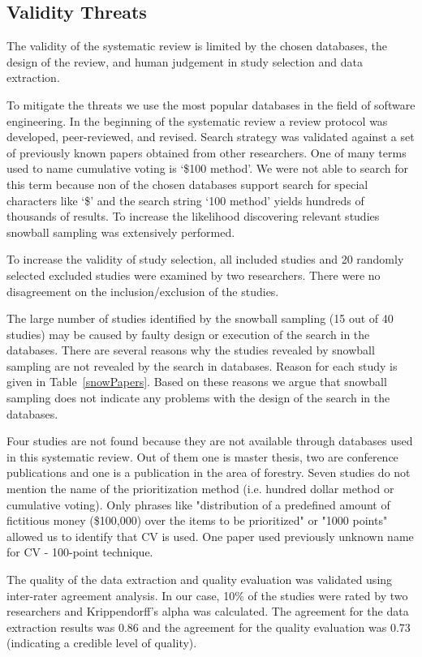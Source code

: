 \subsection{Validity Threats}
The validity of the systematic review is limited by the chosen databases, the design of the review, and human judgement in study selection and data extraction.

To mitigate the threats we use the most popular databases in the field of software engineering.
In the beginning of the systematic review a review protocol was developed, peer-reviewed, and revised.
Search strategy was validated against a set of previously known papers obtained from other researchers.
One of many terms used to name cumulative voting is `\$100 method'.
We were not able to search for this term because non of the chosen databases support search for special characters like `\$' and the search string `100 method' yields hundreds of thousands of results.
To increase the likelihood discovering relevant studies snowball sampling was extensively performed.

To increase the validity of study selection, all included studies and 20 randomly selected excluded studies were examined by two researchers.
There were no disagreement on the inclusion/exclusion of the studies.

The large number of studies identified by the snowball sampling (15 out of 40 studies) may be caused by faulty design or execution of the search in the databases.
There are several reasons why the studies revealed by snowball sampling are not revealed by the search in databases. Reason for each study is given in Table~\ref{snowPapers}.
Based on these reasons we argue that snowball sampling does not indicate any problems with the design of the search in the databases.

Four studies are not found because they are not available through databases used in this systematic review. Out of them one is master thesis, two are conference publications and one is a publication in the area of forestry.
Seven studies do not mention the name of the prioritization method (i.e. hundred dollar method or cumulative voting).
Only phrases like "distribution of a predefined amount of fictitious money (\$100,000) over the items to be prioritized" or "1000 points" allowed us to identify that CV is used.
One paper used previously unknown name for CV - 100-point technique.

The quality of the data extraction and quality evaluation was validated using inter-rater agreement analysis.
In our case, 10\% of the studies were rated by two researchers and Krippendorff's alpha was calculated.
The agreement for the data extraction results was 0.86 and the agreement for the quality evaluation was 0.73 (indicating a credible level of quality).

